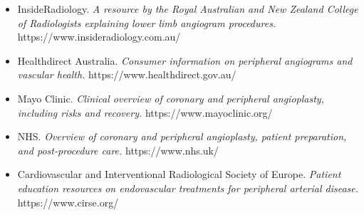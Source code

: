 \begin{itemize}
    \item InsideRadiology. \textit{A resource by the Royal Australian and New Zealand College of Radiologists explaining lower limb angiogram procedures.} https://www.insideradiology.com.au/
    \item Healthdirect Australia. \textit{Consumer information on peripheral angiograms and vascular health.} https://www.healthdirect.gov.au/
    \item Mayo Clinic. \textit{Clinical overview of coronary and peripheral angioplasty, including risks and recovery.} https://www.mayoclinic.org/
    \item NHS. \textit{Overview of coronary and peripheral angioplasty, patient preparation, and post-procedure care.} https://www.nhs.uk/
    \item Cardiovascular and Interventional Radiological Society of Europe. \textit{Patient education resources on endovascular treatments for peripheral arterial disease.} https://www.cirse.org/
\end{itemize}
